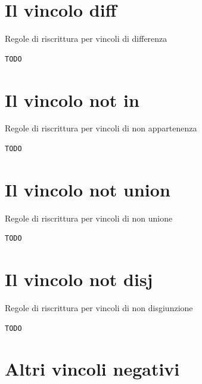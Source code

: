 \documentclass[12pt,a4paper,openright]{book} %
\begin{document}
\section{Il vincolo diff}

\begin{algorithm}[H]
	\caption{Regole di riscrittura per vincoli di differenza}
	\label{alg:diff_constraints}
\end{algorithm}
\begin{verbatim}
TODO
\end{verbatim}

\section{Il vincolo not in}

\begin{algorithm}[H]
	\caption{Regole di riscrittura per vincoli di non appartenenza}
	\label{alg:notin_constraints}
\end{algorithm}
\begin{verbatim}
TODO
\end{verbatim}

\section{Il vincolo not union}

\begin{algorithm}[H]
	\caption{Regole di riscrittura per vincoli di non unione}
	\label{alg:notun_constraints}
\end{algorithm}
\begin{verbatim}
TODO
\end{verbatim}

\section{Il vincolo not disj}

\begin{algorithm}[H]
	\caption{Regole di riscrittura per vincoli di non disgiunzione}
	\label{alg:notdisj_constraints}
\end{algorithm}
\begin{verbatim}
TODO
\end{verbatim}

\section{Altri vincoli negativi}
\end{document}

